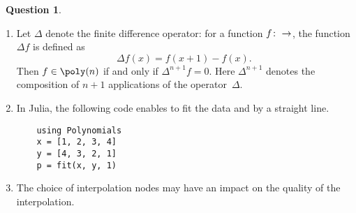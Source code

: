 \documentclass[10pt]{article}
\theoremstyle{definition}
\newtheorem{question}{{\normalfont \faGears}~Question}
\theoremstyle{remark}
\begin{document}
\begin{question}
\begin{enumerate}
        \item
            Let $\Delta$ denote the finite difference operator:
            for a function $f \colon \real \to \real$,
            the function $\Delta f$ is defined as
            \[
                \Delta f(x) = f(x + 1) - f(x).
            \]
            Then $f \in \poly(n)$ if and only if $\Delta^{n+1} f = 0$.
            Here $\Delta^{n+1}$ denotes the composition of $n+1$ applications of the operator~$\Delta$.

        \item
            In Julia, the following code enables to fit the data  and  by a straight line.
            \begin{verbatim}
    using Polynomials
    x = [1, 2, 3, 4]
    y = [4, 3, 2, 1]
    p = fit(x, y, 1)
            \end{verbatim}

        \item
            The choice of interpolation nodes may have an impact on the quality of the interpolation.
\end{enumerate}
\end{question}
\end{document}
